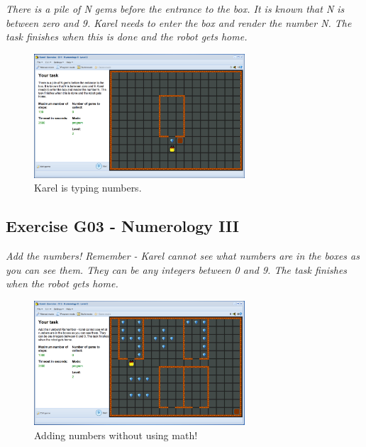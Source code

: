 \documentclass[article,A4,12pt]{llncs}
\begin{document}
{{{{{\em There is a pile of N gems before the entrance to the box. It is known that N is between zero and 9. Karel needs to enter the box and render the number N. The task finishes when this is done and the robot gets home.}

\newpage
\begin{figure}[!ht]
\begin{center}
\includegraphics[width=0.7\textwidth]{img/g11.png}
\end{center}
\vspace{-4mm}
\caption{Karel is typing numbers.}
\label{fig:g11}
\vspace{-4mm}
\end{figure}
\noindent

\subsection{Exercise G03 - Numerology III}

{\em Add the numbers! Remember - Karel cannot see what numbers are in the boxes as you can see them. They can be any integers between 0 and 9. The task finishes when the robot gets home.}


\begin{figure}[!ht]
\begin{center}
\includegraphics[width=0.7\textwidth]{img/g12.png}
\end{center}
\vspace{-4mm}
\caption{Adding numbers without using math!}
\label{fig:g12}
\vspace{-4mm}
\end{figure}
\noindent

}}}}
\end{document}
